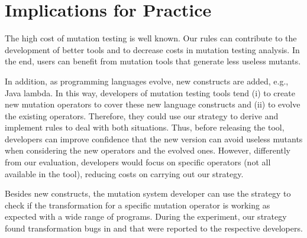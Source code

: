 \chapter{Implications for Practice}
\label{chp:implications}

The high cost of mutation testing is well known. 
Our rules can contribute to the development of better tools and to decrease costs in mutation testing analysis. 
In the end, users can benefit from mutation tools that generate less useless mutants.

In addition, as programming languages evolve, new constructs are added, e.g., Java lambda. 
In this way, developers of mutation testing tools tend (i) to create new mutation operators to cover these new language constructs and (ii) to evolve the existing operators. 
Therefore, they could use our strategy to derive and implement rules to deal with both situations. 
Thus, before releasing the tool, developers can improve confidence that the new version can avoid useless mutants when considering the new operators and the evolved ones. 
However, differently from our evaluation, developers would focus on specific operators (not all available in the tool), reducing costs on carrying out our strategy.

Besides new constructs, the mutation system developer can use the strategy to check if the transformation for a specific mutation operator is working as expected with a wide range of programs. 
During the experiment, our strategy found transformation bugs in \mujava{} and \pit{} that were reported to the respective developers.


